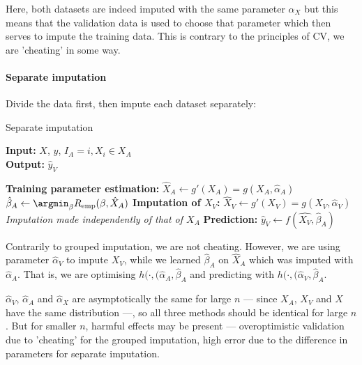 Here, both datasets are indeed imputed with the same parameter $\alpha_X$ but this means that the validation data is used to choose that parameter which then serves to impute the training data. This is contrary to the principles of CV, we are 'cheating' in some way.

\paragraph{Separate imputation}
Divide the data first, then impute each dataset separately:
\begin{algorithm}[H]
	\caption{Separate imputation}
	\hspace*{\algorithmicindent} \textbf{Input:} $X$, $y$, $I_A={i, X_i \in X_A}$  \\
 	\hspace*{\algorithmicindent} \textbf{Output:} $\hat{y}_V$
	\begin{algorithmic}[1]
		\State \textbf{Training parameter estimation:}
		\Indstate $\hat{X}_A \leftarrow g'(X_A) = g(X_A, \hat{\alpha}_A)$
		\Indstate $\hat{\beta}_A \leftarrow \argmin_{\beta} R_{\text{emp}}(\beta,\hat{X}_A)$
		\State \textbf{Imputation of $X_V$:}
		\Indstate $\hat{X}_V \leftarrow g'(X_V) = g(X_V, \hat{\alpha}_V)$ \Comment \emph{Imputation made independently of that of $X_A$}
		\State \textbf{Prediction:}
		\Indstate $\hat{y}_V \leftarrow f(\hat{X_V}, \hat{\beta}_A)$
	\end{algorithmic}
\end{algorithm}

Contrarily to grouped imputation, we are not cheating. However, we are using parameter $\hat{\alpha}_V$ to impute $X_V$, while we learned $\hat{\beta}_A$ on $\hat{X}_A$ which was imputed with $\hat{\alpha}_A$. That is, we are optimising $h(\cdot,(\hat{\alpha}_A, \hat{\beta}_A$ and predicting with  $h(\cdot,(\hat{\alpha}_V, \hat{\beta}_A$.

$\hat{\alpha}_V$, $\hat{\alpha}_A$ and $\hat{\alpha}_X$ are asymptotically the same for large $n$ --- since $X_A$, $X_V$ and $X$ have the same distribution ---, so all three methods should be identical for large $n$. But for smaller $n$, harmful effects may be present --- overoptimistic validation due to 'cheating' for the grouped imputation, high error due to the difference in parameters for separate imputation.


